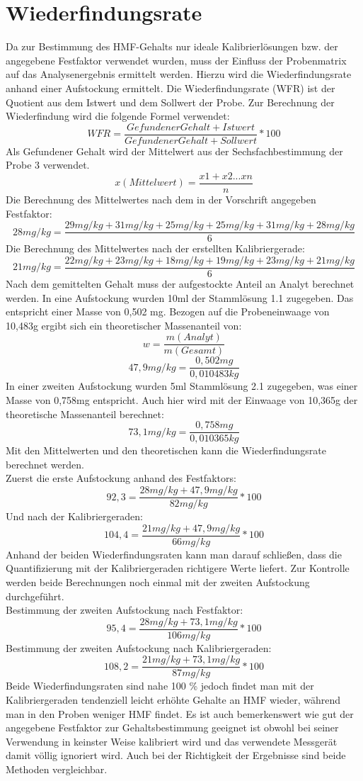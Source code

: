 \section{Wiederfindungsrate}
Da zur Bestimmung des HMF-Gehalts nur ideale Kalibrierlösungen bzw. der angegebene Festfaktor verwendet wurden, muss der Einfluss der Probenmatrix auf das Analysenergebnis ermittelt werden. Hierzu wird die Wiederfindungsrate anhand einer Aufstockung ermittelt. Die Wiederfindungsrate (WFR) ist der Quotient aus dem Istwert und dem Sollwert der Probe. Zur Berechnung der Wiederfindung wird die folgende Formel verwendet:
	\[WFR=\frac{ Gefundener Gehalt + Istwert }{ Gefundener Gehalt + Sollwert } *100 \]
Als Gefundener Gehalt wird der Mittelwert aus der Sechsfachbestimmung der Probe 3 verwendet.
	\[x(Mittelwert)=\frac{ x1+x2...xn }{ n } \]
Die Berechnung des Mittelwertes nach dem in der Vorschrift angegeben  Festfaktor:
	\[28mg/kg=\frac{ 29mg/kg+31mg/kg+25mg/kg+25mg/kg+31mg/kg+28mg/kg }{ 6 } \]
Die Berechnung des Mittelwertes nach der erstellten Kalibriergerade:
	\[21mg/kg=\frac{ 22mg/kg+23mg/kg+18mg/kg+19mg/kg+23mg/kg+21mg/kg }{ 6 } \]
Nach dem gemittelten Gehalt muss der aufgestockte Anteil an Analyt berechnet werden. In eine Aufstockung wurden 10ml der Stammlösung 1.1 zugegeben. Das entspricht einer Masse von 0,502 mg. Bezogen auf die Probeneinwaage von 10,483g ergibt sich ein theoretischer Massenanteil von:  
	\[w=\frac{ m(Analyt) }{ m(Gesamt) } \]
	\[47,9mg/kg=\frac{ 0,502mg }{ 0,010483kg } \]
In einer zweiten Aufstockung wurden 5ml Stammlösung 2.1 zugegeben, was einer Masse von 0,758mg entspricht. Auch hier wird mit der Einwaage von 10,365g der theoretische Massenanteil berechnet:
	\[73,1mg/kg=\frac{ 0,758mg }{ 0,010365kg } \]
Mit den Mittelwerten und den theoretischen kann die Wiederfindungsrate berechnet werden.\\
Zuerst die erste Aufstockung anhand des Festfaktors:
	\[92,3=\frac{ 28mg/kg + 47,9mg/kg }{ 82mg/kg } *100 \]
Und nach der Kalibriergeraden:
	\[104,4=\frac{ 21mg/kg + 47,9mg/kg }{ 66mg/kg } *100 \]
Anhand der beiden Wiederfindungsraten kann man darauf schließen, dass die Quantifizierung mit der Kalibriergeraden richtigere Werte liefert. Zur Kontrolle werden beide Berechnungen noch einmal mit der zweiten Aufstockung durchgeführt.\\
Bestimmung der zweiten Aufstockung nach Festfaktor:
	\[95,4=\frac{ 28mg/kg + 73,1mg/kg }{ 106mg/kg } *100 \]
Bestimmung der zweiten Aufstockung nach Kalibriergeraden:
	\[108,2=\frac{ 21mg/kg + 73,1mg/kg }{ 87mg/kg } *100 \]
Beide Wiederfindungsraten sind nahe 100 \% jedoch findet man mit der Kalibriergeraden tendenziell leicht erhöhte Gehalte an HMF wieder, während man in den Proben weniger HMF findet. Es ist auch bemerkenswert wie gut der angegebene Festfaktor zur Gehaltsbestimmung geeignet ist obwohl bei seiner Verwendung in keinster Weise kalibriert wird und das verwendete Messgerät damit völlig ignoriert wird. Auch bei der Richtigkeit der Ergebnisse sind beide Methoden vergleichbar.
	
